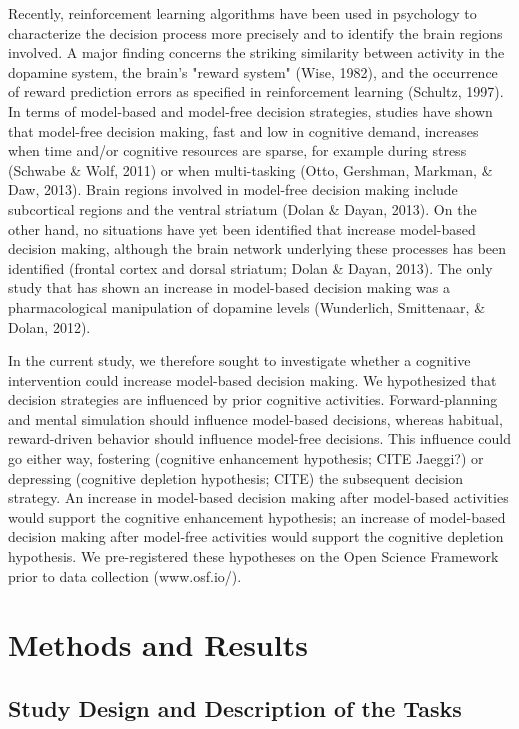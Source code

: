 \documentclass[11pt]{article} %
\begin{document}
Recently, reinforcement learning algorithms have been used in psychology to characterize the decision process more precisely and to identify the brain regions involved. A major finding concerns the striking similarity between activity in the dopamine system, the brain's "reward system" (Wise, 1982), and the occurrence of reward prediction errors as specified in reinforcement learning (Schultz, 1997). In terms of model-based and model-free decision strategies, studies have shown that model-free decision making, fast and low in cognitive demand, increases when time and/or cognitive resources are sparse, for example during stress (Schwabe \& Wolf, 2011) or when multi-tasking (Otto, Gershman, Markman, \& Daw, 2013). Brain regions involved in model-free decision making include subcortical regions and the ventral striatum (Dolan \& Dayan, 2013). On the other hand, no situations have yet been identified that increase model-based decision making, although the brain network underlying these processes has been identified (frontal cortex and dorsal striatum; Dolan \& Dayan, 2013). The only study that has shown an increase in model-based decision making was a pharmacological manipulation of dopamine levels (Wunderlich, Smittenaar, \& Dolan, 2012). 

In the current study, we therefore sought to investigate whether a cognitive intervention could increase model-based decision making. We hypothesized that decision strategies are influenced by prior cognitive activities. Forward-planning and mental simulation should influence model-based decisions, whereas habitual, reward-driven behavior should influence model-free decisions. This influence could go either way, fostering (cognitive enhancement hypothesis; CITE Jaeggi?) or depressing (cognitive depletion hypothesis; CITE) the subsequent decision strategy. An increase in model-based decision making after model-based activities would support the cognitive enhancement hypothesis; an increase of model-based decision making after model-free activities would support the cognitive depletion hypothesis. We pre-registered these hypotheses on the Open Science Framework prior to data collection (www.osf.io/).

\section{Methods and Results}
\subsection{Study Design and Description of the Tasks}
\end{document}

